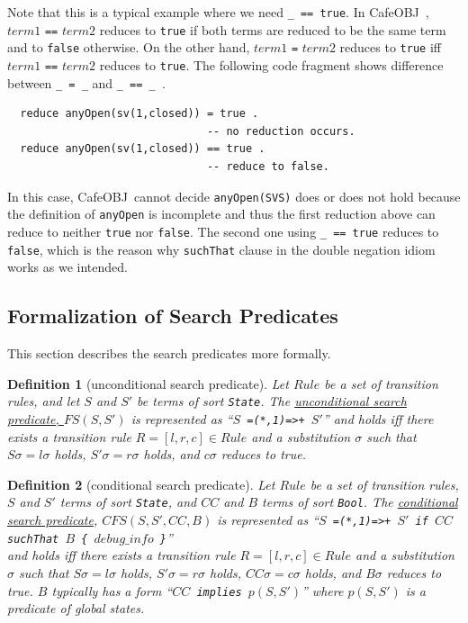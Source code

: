 \documentclass[12pt]{report}
\newtheorem{definition}{Definition}
\newcommand{\stt}[1]{{\small{\tt {#1}}}}
\newcommand{\ul}{\underline}
\newcommand{\cafeobj}{{\sf CafeOBJ}~}
\begin{document}
Note that this is a typical example where we need \stt{\_ == true}. In
\cafeobj, $term1$ {\tt ==} $term2$ reduces to {\tt true} if both terms
are reduced to be the same term and to {\tt false} otherwise. On the
other hand, $term1$ {\tt =} $term2$ reduces to {\tt true} iff $term1$
{\tt ==} $term2$ reduces to {\tt true}. The following code fragment
shows difference between \stt{\_ = \_} and \stt{\_ == \_ }.
\small
\begin{verbatim}
  reduce anyOpen(sv(1,closed)) = true .
                               -- no reduction occurs.
  reduce anyOpen(sv(1,closed)) == true . 
                               -- reduce to false.
\end{verbatim}
\normalsize
In this case, \cafeobj cannot decide \stt{anyOpen(SVS)} does or does
not hold because the definition of {\tt anyOpen} is incomplete and
thus the first reduction above can reduce to neither {\tt true} nor
{\tt false}.  The second one using \stt{\_ == true} reduces to
{\tt false}, which is the reason why {\tt suchThat} clause in the
double negation idiom works as we intended.

\subsection{Formalization of Search Predicates}
\label{sec:formalSearch}
This section describes the search predicates more formally.  
\begin{definition}[unconditional search predicate]
  Let $Rule$ be a set of transition rules, and let $S$ and $S'$ be
  terms of sort {\tt State}. The \ul{unconditional search predicate,
    $FS(S,S')$} is represented as ``\stt{$S$ =(*,1)=>+ $S'$}''
  and holds iff there exists a transition rule $R=[l,r,c]\in Rule$ and
  a substitution $\sigma$ such that $S\sigma=l\sigma$ holds,
  $S'\sigma=r\sigma$ holds, and $c\sigma$ reduces to true.
\end{definition}
\begin{definition}[conditional search predicate]
  Let $Rule$ be a set of transition rules, $S$ and $S'$ terms of
  sort {\tt State}, and $CC$ and $B$ terms of sort {\tt Bool}. The
  \ul{conditional search predicate}, \ul{$CFS(S,S',CC,B)$} is
  represented as ``\stt{$S$ =(*,1)=>+ $S'$ if $CC$ suchThat $B$ \{
    $debug\_info$ \}}''\\ and holds iff there exists a transition
  rule $R=[l,r,c]\in Rule$ and a substitution $\sigma$ such that
  $S\sigma=l\sigma$ holds, $S'\sigma=r\sigma$ holds,
  $CC\sigma=c\sigma$ holds, and $B\sigma$ reduces to true.
  $B$ typically has a form ``\stt{$CC$ implies $p(S,S')$}'' where
  $p(S,S')$ is a predicate of global states.
\end{definition}
\end{document}
